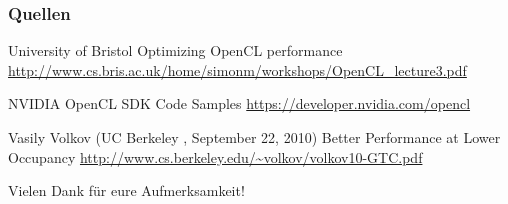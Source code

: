 \documentclass{beamer}
\begin{document}

\begin{frame}
\frametitle{Quellen}


\footnotesize{
\begin{thebibliography}{99}
  University of Bristol
 \newblock Optimizing OpenCL performance
 \newblock \url{http://www.cs.bris.ac.uk/home/simonm/workshops/OpenCL_lecture3.pdf} 
\end{thebibliography}
}



\footnotesize{
\begin{thebibliography}{99}
 NVIDIA 
 \newblock OpenCL SDK Code Samples
 \newblock \url{https://developer.nvidia.com/opencl} 
\end{thebibliography}
}


\footnotesize{
\begin{thebibliography}{99}
  Vasily Volkov
(UC Berkeley , September 22, 2010)
 \newblock Better Performance at Lower Occupancy 
 \newblock \url{http://www.cs.berkeley.edu/~volkov/volkov10-GTC.pdf} 
\end{thebibliography}
}





\end{frame}
 
 
 
\begin{frame}
\centerline{Vielen Dank f{\"u}r eure Aufmerksamkeit!}
\end{frame}
\end{document}
